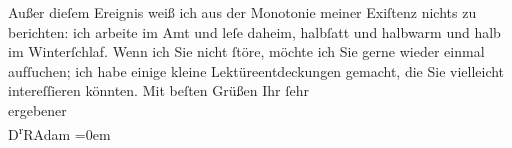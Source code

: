 \begin{ledgroupsized}[t]{13cm}
           \pstart
           Außer dieſem Ereignis weiß ich aus der Monotonie meiner Exiſtenz nichts zu berichten:
               ich arbeite im Amt und leſe daheim, halbſatt und halbwarm und halb im
               Winterſchlaf.\pend
           \pstart
           Wenn ich Sie nicht ſtöre, möchte ich Sie gerne wieder einmal aufſuchen; ich habe
               einige kleine Lektüreentdeckungen gemacht, die Sie vielleicht intereſſieren
               könnten.\pend
           \pstart
           Mit beſten Grüßen Ihr ſehr{\\[\baselineskip]}ergebener{\\[\baselineskip]}\spacefill\mbox{D\textsuperscript{r}RAdam}\pend
           \leftskip=0em{}
         
         \endnumbering{}\end{ledgroupsized}  \newcommand{\dateiname}{L02319}\newcommand{\titel}{Robert Adam an Arthur Schnitzler, 17. 1. 1919}\newcommand{\editorInnen}{Martin Anton Müller und Gerd-Hermann Susen}
      